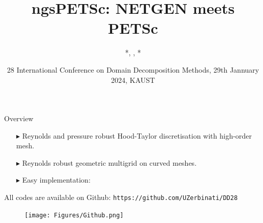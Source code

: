 \documentclass{beamer}
\title[ngsPETSc]{ngsPETSc: NETGEN meets PETSc} %
\author%
{%
	\sc{P.~E.~Farrell}*, \sc{S.~Zampini$\dag$}, \underline{\sc{U.~Zerbinati}}*\\
}
\institute%
{%
	* \textit{Mathematical Institute}\\
	\;\textit{University of Oxford}\\
	$\newline$
	$\dag$ \textit{Extreme Computing Research Center}\\
	\;\textit{King Abdullah University of Science and Technology}\\	
}
\date[\textbf{DD28}]{28 International Conference on Domain Decomposition Methods, 29th Jannuary 2024, KAUST} %
\begin{document}
	\begin{frame}[plain]
		\titlepage
	\end{frame}
	\begin{frame}{Overview}
		\begin{itemize}
			\item[\color{oxfordblue}$\blacktriangleright$] Reynolds and pressure robust Hood-Taylor discretisation with high-order mesh.
			\item[\color{oxfordblue}$\blacktriangleright$] Reynolds robust geometric multigrid on curved meshes.
			\item[\color{oxfordblue}$\blacktriangleright$] Easy implementation:
		\end{itemize}
		\begin{minipage}{0.58\textwidth}
			All codes are available on Github:
			\texttt{https://github.com/UZerbinati/DD28}
		\end{minipage}
		\begin{minipage}{0.3\textwidth}
			\begin{figure}
				\centering
				\texttt{[image: Figures/Github.png]}
			\end{figure}
		\end{minipage}
	\end{frame}
\end{document}
